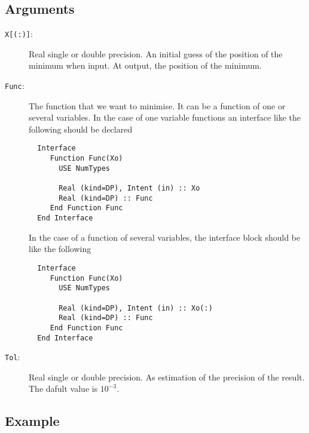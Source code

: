 \subsection{Arguments}

\begin{description}
\item[\texttt{X[(:)]}:] Real single or double precision. An initial guess
  of the position of the minimum when input. At output, the position
  of the minimum.
\item[\texttt{Func}:]  The function that we want to minimise. It can
  be a function of one or several variables. In the case of one
  variable functions an interface like the following should be
  declared
\begin{verbatim}
  Interface
     Function Func(Xo)
       USE NumTypes
       
       Real (kind=DP), Intent (in) :: Xo
       Real (kind=DP) :: Func
     End Function Func
  End Interface
\end{verbatim}
  In the case of a function of several variables, the interface block
  should be like the following
\begin{verbatim}
  Interface
     Function Func(Xo)
       USE NumTypes
       
       Real (kind=DP), Intent (in) :: Xo(:)
       Real (kind=DP) :: Func
     End Function Func
  End Interface
\end{verbatim}

\item[\texttt{Tol}:] Real single or double precision. As estimation of
  the precision of the result. The dafult value is $10^{-3}$.
  
\end{description}

\subsection{Example}


